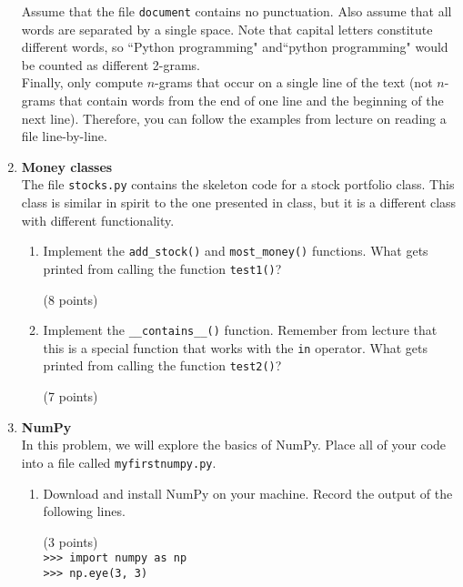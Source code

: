 \documentclass{article}
\newcounter{points}
\newcommand\setpoints[1]{\addtocounter{points}{#1}(#1 points)}
\begin{document}
\begin{enumerate}
Assume that the file \texttt{document} contains no punctuation.  Also assume that all words are separated by a single space. Note that capital letters constitute different words, so ``Python programming" and``python programming" would be counted as different 2-grams. \\

Finally, only compute $n$-grams that occur on a single line of the text (not $n$-grams that contain words from the end of one line and the beginning of the next line).  Therefore, you can follow the examples from lecture on reading a file line-by-line. \\

\item \textbf{Money classes} \\
The file \texttt{stocks.py} contains the skeleton code for a stock portfolio class.  This class is similar in spirit to the one presented in class, but it is a different class with different functionality.

\begin{enumerate}
\item Implement the \texttt{add\_stock()} and \texttt{most\_money()} functions.  What gets printed from calling the function \texttt{test1()}? \setpoints{8}
\end{enumerate}

\begin{enumerate}
\setcounter{enumii}{1}
\item Implement the \texttt{\_\_contains\_\_()} function.  Remember from lecture that this is a special function that works with the \texttt{in} operator.  What gets printed from calling the function \texttt{test2()}? \setpoints{7}
\end{enumerate}

\newpage
\item \textbf{NumPy} \\
In this problem, we will explore the basics of NumPy.  Place all of your code into a file called \texttt{myfirstnumpy.py}.

\begin{enumerate}
\item Download and install NumPy on your machine.  Record the output of the following lines.  \setpoints{3} \\
\texttt{>>> import numpy as np} \\
\texttt{>>> np.eye(3, 3)} \\
\end{enumerate}


\end{enumerate}
\end{document}
